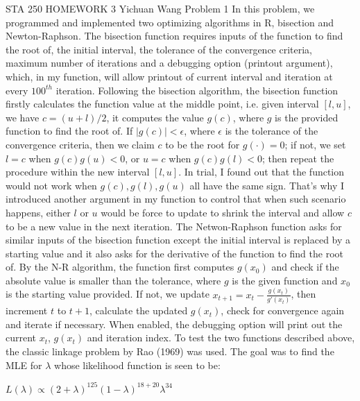 \documentclass[12pt]{article}
\begin{document}
\noindent STA 250 HOMEWORK 3 \newline Yichuan Wang \newline \newline
Problem 1 \newline \newline
In this problem, we programmed and implemented two optimizing algorithms in R, bisection and Newton-Raphson. \newline
The bisection function requires inputs of the function to find the root of, the initial interval, the tolerance of the convergence criteria, maximum number of iterations and a debugging option (printout argument), which, in my function, will allow printout of current interval and iteration at every $100^{th}$ iteration. Following the bisection algorithm, the bisection function firstly calculates the function value at the middle point, i.e. given interval $[l, u]$, we have $c = (u+l)/2$, it computes the value $g(c)$, where $g$ is the provided function to find the root of. If $|g(c)| < \epsilon$, where $\epsilon$ is the tolerance of the convergence criteria, then we claim $c$ to be the root for $g(\cdot) = 0$; if not, we set $l = c$ when $g(c)g(u) < 0$, or $u = c$ when $g(c)g(l) < 0$; then repeat the procedure within the new interval $[l,u]$. In trial, I found out that the function would not work when $g(c), g(l), g(u)$ all have the same sign. That's why I introduced another argument in my function to control that when such scenario happens, either $l$ or $u$ would be force to update to shrink the interval and allow $c$ to be a new value in the next iteration. \newline
The Netwon-Raphson function asks for similar inputs of the bisection function except the initial interval is replaced by a starting value and it also asks for the derivative of the function to find the root of. By the N-R algorithm, the function first computes $g(x_0)$ and check if the absolute value is smaller than the tolerance, where $g$ is the given function and $x_0$ is the starting value provided. If not, we update $x_{t+1} = x_t - \frac{g(x_t)}{g'(x_t)}$, then increment $t$ to $t+1$, calculate the updated $g(x_t)$, check for convergence again and iterate if necessary. When enabled, the debugging option will print out the current $x_t$, $g(x_t)$ and iteration index. \newline
To test the two functions described above, the classic linkage problem by Rao (1969) was used. The goal was to find the MLE for $\lambda$ whose likelihood function is seen to be:
\begin{center}
	$L(\lambda) \propto (2+\lambda)^{125}(1-\lambda)^{18+20}\lambda^{34}$
\end{center}
\end{document}
